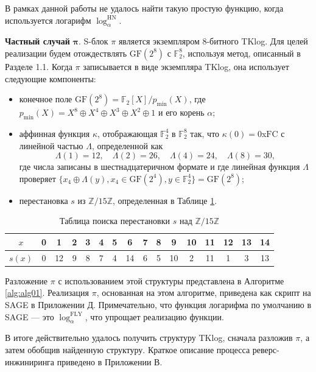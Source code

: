 В рамках данной работы не удалось найти такую простую функцию, когда используется логарифм \(\log_{\alpha}^{\text{HN}}\).

\textbf{Частный случай} $\bm{\pi}$. S-блок \(\pi\) является экземпляром 8-битного TKlog. Для целей реализации будем отождествлять \(\text{GF}(2^8)\) с \(\mathbb{F}^8_2\), используя метод, описанный в Разделе 1.1. Когда \(\pi\) записывается в виде экземпляра TKlog, она использует следующие компоненты:

\begin{itemize}
    \item конечное поле \(\text{GF}(2^8) = \mathbb{F}_2[X]/p_{\text{min}}(X)\), где \(p_{\text{min}}(X) = X^8 \oplus X^4 \oplus X^3 \oplus X^2 \oplus 1\) и его корень \(\alpha\);
    \item аффинная функция \(\kappa\), отображающая \(\mathbb{F}^4_2\) в \(\mathbb{F}^8_2\) так, что \(\kappa(0) = 0\)x\(\text{FC}\) с линейной частью \(\Lambda\), определенной как
    \[
    \Lambda(1) = 12, \quad \Lambda(2) = 26, \quad \Lambda(4) = 24, \quad \Lambda(8) = 30,
    \] где числа записаны в шестнадцатеричном формате и где линейная функция \(\Lambda\) проверяет \(\{x_4 \oplus \Lambda(y), x_4 \in \text{GF}(2^4), y \in \mathbb{F}^4_2\} = \text{GF}(2^8)\);
    \item перестановка \(s\) из \(\mathbb{Z}/15\mathbb{Z}\), определенная в Таблице \ref{tab:tab1}.
\end{itemize}

\begin{table}    
  \caption{Таблица поиска перестановки \(s\) над \(\mathbb{Z}/15\mathbb{Z}\)}
  \begin{tabular}{cccccccccccccccc}
    \hline$x$ & 0 & 1 & 2 & 3 & 4 & 5 & 6 & 7 & 8 & 9 & 10 & 11 & 12 & 13 & 14 \\
    \hline$s(x)$ & 0 & 12 & 9 & 8 & 7 & 4 & 14 & 6 & 5 & 10 & 2 & 11 & 1 & 3 & 13 \\
    \hline
  \end{tabular}
  \label{tab:tab1}
\end{table}

Разложение \(\pi\) с использованием этой структуры представлена в Алгоритме \ref{alg:alg01}. Реализация \(\pi\), основанная на этом алгоритме, приведена как скрипт на SAGE \cite{Dev17} в Приложении Д. Примечательно, что функция логарифма по умолчанию в SAGE — это \(\log_{\alpha}^{\text{FLY}}\), что упрощает реализацию функции.

В итоге действительно удалось получить структуру TKlog, сначала разложив \(\pi\), а затем обобщив найденную структуру. Краткое описание процесса реверс-инжиниринга приведено в Приложении В.

